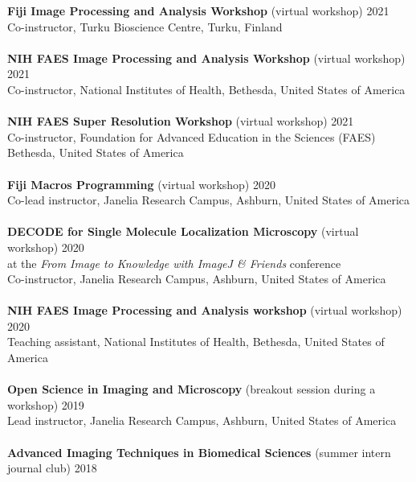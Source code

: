 \documentclass[margin,line]{res}
\begin{document}
\begin{resume}
{\bf  Fiji Image Processing and Analysis Workshop} (virtual workshop)  \hfill 2021\\
Co-instructor, Turku Bioscience Centre, Turku, Finland\\
\vspace*{-3mm}\\
{\bf  NIH FAES Image Processing and Analysis Workshop} (virtual workshop)  \hfill 2021\\
Co-instructor, National Institutes of Health, Bethesda, United States of America\\
\vspace*{-3mm}\\
{\bf  NIH FAES Super Resolution Workshop} (virtual workshop)  \hfill 2021\\
Co-instructor, Foundation for Advanced Education in the Sciences (FAES)\\
Bethesda, United States of America\\
\vspace*{-3mm}\\
{\bf Fiji Macros Programming} (virtual workshop)  \hfill 2020\\
Co-lead instructor, Janelia Research Campus, Ashburn, United States of America\\
\vspace*{-3mm}\\
{\bf DECODE for Single Molecule Localization Microscopy} (virtual workshop)  \hfill 2020\\
at the \emph{From Image to Knowledge with ImageJ \& Friends} conference\\
Co-instructor, Janelia Research Campus, Ashburn, United States of America\\
\vspace*{-3mm}\\
{\bf  NIH FAES Image Processing and Analysis workshop} (virtual workshop)  \hfill 2020\\
 Teaching assistant, National Institutes of Health, Bethesda, United States of America\\
\vspace*{-3mm}\\
{\bf  Open Science in Imaging and Microscopy} (breakout session during a workshop)  \hfill 2019\\
Lead instructor, Janelia Research Campus, Ashburn, United States of America\\
\vspace*{-3mm}\\
{\bf Advanced Imaging Techniques in Biomedical Sciences} (summer intern journal club) \hfill {2018}\\

\end{resume}
\end{document}
